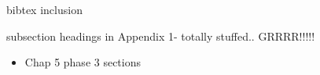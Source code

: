 \documentclass{report}
\begin{document}
\begin{itemise}   
\item bibtex inclusion
\item subsection headings in Appendix 1- totally stuffed.. GRRRR!!!!!

\end{itemise}

\begin{itemize}
  \item Chap 5 phase 3 sections
\end{itemize}
\end{document}
